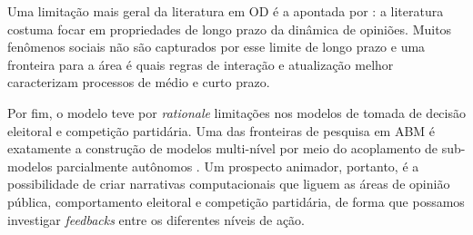 Uma limitação mais geral da literatura em OD é a apontada por
: a literatura costuma focar em propriedades de
longo prazo da dinâmica de opiniões. Muitos fenômenos sociais não são capturados
por esse limite de longo prazo e uma fronteira para a área é quais regras de
interação e atualização melhor caracterizam processos de médio e curto prazo.

Por fim, o modelo teve por \textit{rationale} limitações nos modelos de tomada
de decisão eleitoral e competição partidária. Uma das fronteiras de pesquisa em
ABM é exatamente a construção de modelos multi-nível por meio do acoplamento de
sub-modelos parcialmente autônomos \cite{hjorth2016turtles,head2015evolving}. Um
prospecto animador, portanto, é a possibilidade de criar narrativas
computacionais que liguem as áreas de opinião pública, comportamento eleitoral e
competição partidária, de forma que possamos investigar \textit{feedbacks} entre
os diferentes níveis de ação.




